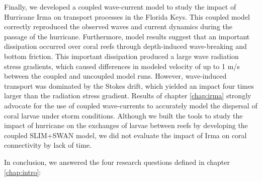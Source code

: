 Finally, we developed a coupled wave-current model to study the impact of Hurricane Irma on transport processes in the Florida Keys. This coupled model correctly reproduced the observed waves and current dynamics during the passage of the hurricane. Furthermore, model results suggest that an important dissipation occurred over coral reefs through depth-induced wave-breaking and bottom friction. This important dissipation produced a large wave radiation stress gradients, which caused differences in modeled velocity of up to 1 m/s between the coupled and uncoupled model runs. However, wave-induced transport was dominated by the Stokes drift, which yielded an impact four times larger than the radiation stress gradient. Results of chapter \ref{chap:irma} strongly advocate for the use of coupled wave-currents to accurately model the dispersal of coral larvae under storm conditions. Although we built the tools to study the impact of hurricane on the exchanges of larvae between reefs by developing the coupled SLIM+SWAN model, we did not evaluate the impact of Irma on coral connectivity by lack of time.

In conclusion, we answered the four research questions defined in chapter \ref{chap:intro}:


